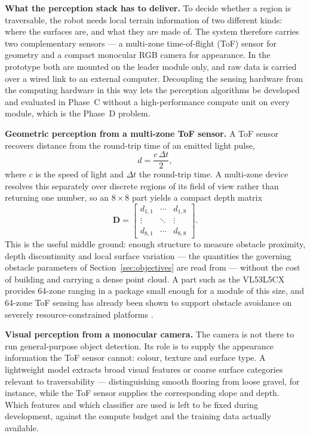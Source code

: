 \documentclass[11pt,a4paper]{article}
\newif\ifreview
\newcommand{\pending}[1]{\ifreview{\color{blue}#1}\else#1\fi}
\begin{document}
\pending{%
\noindent\textbf{What the perception stack has to deliver.} To decide whether a
region is traversable, the robot needs local terrain information of two
different kinds: where the surfaces are, and what they are made of. The system
therefore carries two complementary sensors --- a multi-zone time-of-flight
(ToF) sensor for geometry and a compact monocular RGB camera for appearance.
In the prototype both are mounted on the leader module only, and raw data is
carried over a wired link to an external computer. Decoupling the sensing
hardware from the computing hardware in this way lets the perception algorithms
be developed and evaluated in Phase~C without a high-performance compute unit
on every module, which is the Phase~D problem.

\noindent\textbf{Geometric perception from a multi-zone ToF sensor.} A ToF
sensor recovers distance from the round-trip time of an emitted light pulse,
\begin{equation}
  d = \frac{c\,\Delta t}{2},
\end{equation}
where $c$ is the speed of light and $\Delta t$ the round-trip time. A
multi-zone device resolves this separately over discrete regions of its field
of view rather than returning one number, so an $8\times8$ part yields a compact
depth matrix
\begin{equation}
  \mathbf{D} = \begin{bmatrix}
    d_{1,1} & \cdots & d_{1,8} \\
    \vdots  & \ddots & \vdots  \\
    d_{8,1} & \cdots & d_{8,8}
  \end{bmatrix}.
\end{equation}
This is the useful middle ground: enough structure to measure obstacle
proximity, depth discontinuity and local surface variation --- the quantities
the governing obstacle parameters of Section~\ref{sec:objectives} are read from
--- without the cost of building and carrying a dense point cloud. A part such
as the VL53L5CX provides 64-zone ranging in a package small enough for a module
of this size, and 64-zone ToF sensing has already been shown to support
obstacle avoidance on severely resource-constrained platforms
\cite{muller2023}.

\noindent\textbf{Visual perception from a monocular camera.} The camera is not
there to run general-purpose object detection. Its role is to supply the
appearance information the ToF sensor cannot: colour, texture and surface
type. A lightweight model extracts broad visual features or coarse surface
categories relevant to traversability --- distinguishing smooth flooring from
loose gravel, for instance, while the ToF sensor supplies the corresponding
slope and depth. Which features and which classifier are used is left to be
fixed during development, against the compute budget and the training data
actually available.

}
\end{document}
